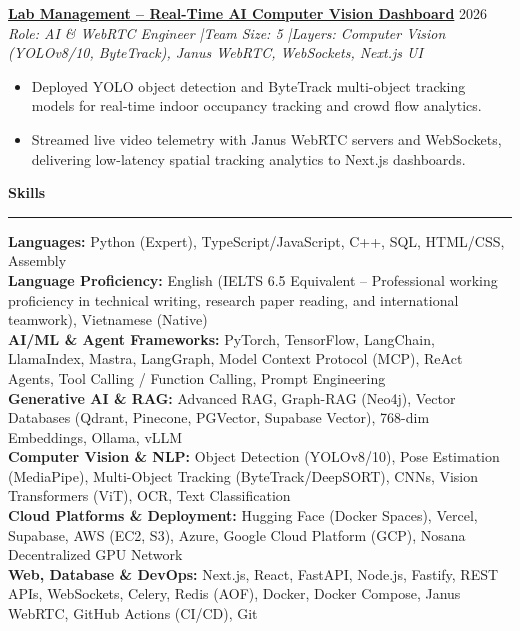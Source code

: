\documentclass[10pt,a4paper]{article}
\newcommand{\sectionhr}[1]{%
  \vspace{0.4em}\noindent\textbf{\large #1}\par
  \vspace{0.2em}\hrule\vspace{0.4em}
}
\begin{document}
\vspace{0.4em}
\href{https://github.com/manhmitcf/DAT_Lab_Management}{\textbf{Lab Management -- Real-Time AI Computer Vision Dashboard}} \hfill 2026 \\
\emph{Role: AI \& WebRTC Engineer \quad|\quad Team Size: 5 \quad|\quad Layers: Computer Vision (YOLOv8/10, ByteTrack), Janus WebRTC, WebSockets, Next.js UI}
\begin{itemize}
\item Deployed YOLO object detection and ByteTrack multi-object tracking models for real-time indoor occupancy tracking and crowd flow analytics.
\item Streamed live video telemetry with Janus WebRTC servers and WebSockets, delivering low-latency spatial tracking analytics to Next.js dashboards.
\end{itemize}

\sectionhr{Skills}
\textbf{Languages:} Python (Expert), TypeScript/JavaScript, C++, SQL, HTML/CSS, Assembly \\
\textbf{Language Proficiency:} English (IELTS 6.5 Equivalent -- Professional working proficiency in technical writing, research paper reading, and international teamwork), Vietnamese (Native) \\
\textbf{AI/ML \& Agent Frameworks:} PyTorch, TensorFlow, LangChain, LlamaIndex, Mastra, LangGraph, Model Context Protocol (MCP), ReAct Agents, Tool Calling / Function Calling, Prompt Engineering \\
\textbf{Generative AI \& RAG:} Advanced RAG, Graph-RAG (Neo4j), Vector Databases (Qdrant, Pinecone, PGVector, Supabase Vector), 768-dim Embeddings, Ollama, vLLM \\
\textbf{Computer Vision \& NLP:} Object Detection (YOLOv8/10), Pose Estimation (MediaPipe), Multi-Object Tracking (ByteTrack/DeepSORT), CNNs, Vision Transformers (ViT), OCR, Text Classification \\
\textbf{Cloud Platforms \& Deployment:} Hugging Face (Docker Spaces), Vercel, Supabase, AWS (EC2, S3), Azure, Google Cloud Platform (GCP), Nosana Decentralized GPU Network \\
\textbf{Web, Database \& DevOps:} Next.js, React, FastAPI, Node.js, Fastify, REST APIs, WebSockets, Celery, Redis (AOF), Docker, Docker Compose, Janus WebRTC, GitHub Actions (CI/CD), Git
\end{document}
